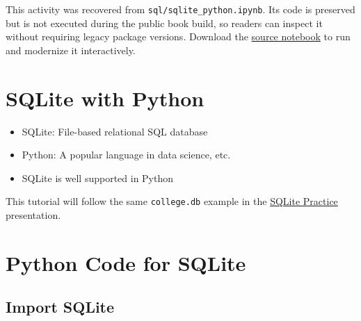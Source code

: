 \documentclass[
  letterpaper,
]{scrbook}
\providecommand{\tightlist}{%
  \setlength{\itemsep}{0pt}\setlength{\parskip}{0pt}}
\begin{document}

\begin{tcolorbox}[enhanced jigsaw, arc=.35mm, bottomrule=.15mm, bottomtitle=1mm, breakable, colback=white, colbacktitle=quarto-callout-note-color!10!white, colframe=quarto-callout-note-color-frame, coltitle=black, left=2mm, leftrule=.75mm, opacityback=0, opacitybacktitle=0.6, rightrule=.15mm, title=\textcolor{quarto-callout-note-color}{\faInfo}\hspace{0.5em}{Historical source and execution note}, titlerule=0mm, toprule=.15mm, toptitle=1mm]

This activity was recovered from \texttt{sql/sqlite\_python.ipynb}. Its
code is preserved but is not executed during the public book build, so
readers can inspect it without requiring legacy package versions.
Download the \href{../notebooks/sqlite-python.ipynb}{source notebook} to
run and modernize it interactively.

\end{tcolorbox}

\section*{SQLite with Python}\label{sqlite-with-python}


\begin{itemize}
\tightlist
\item
  SQLite: File-based relational SQL database
\item
  Python: A popular language in data science, etc.
\item
  SQLite is well supported in Python
\end{itemize}

This tutorial will follow the same \texttt{college.db} example in the
\hyperref[sec-lab-sqlite]{SQLite Practice} presentation.

\section*{Python Code for SQLite}\label{python-code-for-sqlite}


\subsection*{Import SQLite}\label{import-sqlite}
\end{document}
